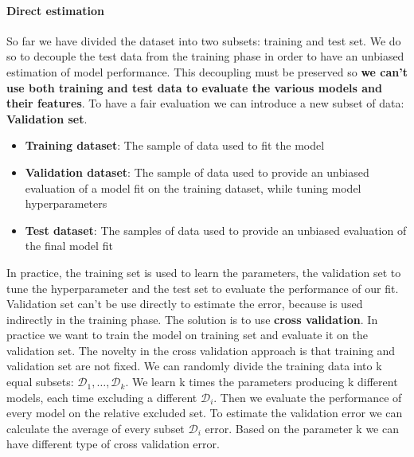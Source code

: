 \documentclass[../main.tex]{subfiles}
\begin{document}
\paragraph{Direct estimation}
So far we have divided the dataset into two subsets: training and test set. We do so to decouple the test data from the training phase in order to have an unbiased estimation of model performance. This decoupling must be preserved so \textbf{we can't use both training and test data to evaluate the various models and their features}. To have a fair evaluation we can introduce a new subset of data: \textbf{Validation set}.
\begin{itemize}
    \item \textbf{Training dataset}: The sample of data used to fit the model
    \item \textbf{Validation dataset}: The sample of data used to provide an unbiased evaluation of a model fit on the training dataset, while tuning model hyperparameters\footnotemark
    \item \textbf{Test dataset}: The samples of data used to provide an unbiased evaluation of the final model fit
\end{itemize}
In practice, the training set is used to learn the parameters, the validation set to tune the hyperparameter and the test set to evaluate the performance of our fit.
Validation set can't be use directly to estimate the error, because is used indirectly in the training phase. The solution is to use \textbf{cross validation}.
In practice we want to train the model on training set and evaluate it on the validation set. The novelty in the cross validation approach is that training and validation set are not fixed\footnotemark.
We can randomly divide the training data into k equal subsets: $\mathcal{D}_1, \dots, \mathcal{D}_k$. We learn k times the parameters producing k different models, each time excluding a different $\mathcal{D}_i$. Then we evaluate the performance of every model on the relative excluded set. To estimate the validation error we can calculate the average of every subset $\mathcal{D}_i$ error. Based on the parameter k we can have different type of cross validation error.
\end{document}
